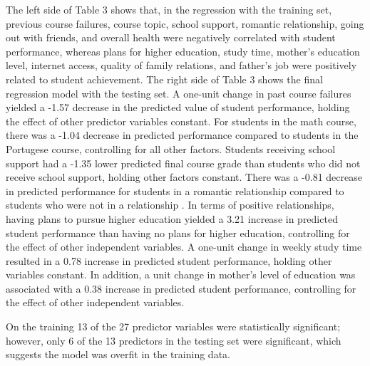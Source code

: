 The left side of Table 3 shows that, in the regression with the training set, 
previous course failures, course topic, school support, romantic relationship, 
going out with friends, and overall health were negatively correlated with 
student performance, whereas plans for higher education, study time, mother's
education level, internet access, quality of family relations, and father's 
job were positively related to student achievement. The right side of Table 3
shows the final regression model with the testing set. A one-unit change in 
past course failures yielded a -1.57 decrease in the predicted value of 
student performance, holding the effect of other predictor variables constant. 
For students in the math course, there was a -1.04 decrease in predicted 
performance compared to students in the Portugese course, controlling for all 
other factors. Students receiving school support had a -1.35 lower predicted 
final course grade than students who did not receive school support, holding
other factors constant. There was a -0.81 decrease in predicted performance 
for students in a romantic relationship compared to students who were not in 
a relationship . In terms of positive relationships, having plans to pursue 
higher education yielded a 3.21 increase in predicted student performance 
than having no plans for higher education, controlling for the effect of other
independent variables. A one-unit change in weekly study time resulted in a 
0.78 increase in predicted student performance, holding other variables 
constant. In addition, a unit change in mother's level of education was 
associated with a 0.38 increase in predicted student performance, controlling 
for the effect of other independent variables. 

On the training 13 of the 27 predictor variables were statistically 
significant; however, only 6 of the 13 predictors in the testing set were 
significant, which suggests the model was overfit in the training data. 


